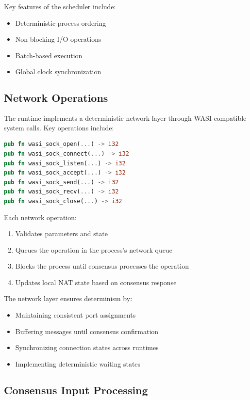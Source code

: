 \documentclass[10pt, 
]{IEEEtran}
\begin{document}
Key features of the scheduler include:
\begin{itemize}
    \item Deterministic process ordering
    \item Non-blocking I/O operations
    \item Batch-based execution
    \item Global clock synchronization
\end{itemize}

\subsection{Network Operations}

The runtime implements a deterministic network layer through WASI-compatible system calls. Key operations include:

\begin{lstlisting}[language=Rust]
pub fn wasi_sock_open(...) -> i32
pub fn wasi_sock_connect(...) -> i32
pub fn wasi_sock_listen(...) -> i32
pub fn wasi_sock_accept(...) -> i32
pub fn wasi_sock_send(...) -> i32
pub fn wasi_sock_recv(...) -> i32
pub fn wasi_sock_close(...) -> i32
\end{lstlisting}

Each network operation:
\begin{enumerate}
    \item Validates parameters and state
    \item Queues the operation in the process's network queue
    \item Blocks the process until consensus processes the operation
    \item Updates local NAT state based on consensus response
\end{enumerate}

The network layer ensures determinism by:
\begin{itemize}
    \item Maintaining consistent port assignments
    \item Buffering messages until consensus confirmation
    \item Synchronizing connection states across runtimes
    \item Implementing deterministic waiting states
\end{itemize}
\subsection{Consensus Input Processing}
\end{document}
